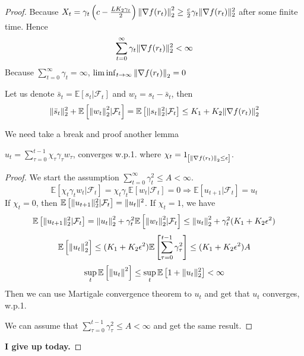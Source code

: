 \begin{theorem}
\begin{proof}
        Because $ X_t = \gamma_t \left( c - \frac{LK_2 \gamma_t}{2}  \right) {\Arrowvert \nabla f(r_t) \Arrowvert}_2^2 \ge \frac{c}{2} \gamma_t \Arrowvert \nabla f(r_t) \Arrowvert^2_2 $ after some finite time. Hence
        \[
            \sum^{\infty}_{t=0} \gamma_t \Arrowvert \nabla f(r_t) \Arrowvert^2_2 < \infty
        \]
        Because $ \sum^{\infty}_{t=0} \gamma_t = \infty $, $ \liminf_{t \rightarrow \infty} {\Arrowvert \nabla f(r_t) \Arrowvert}_2 = 0 $
        
        Let us denote $ \bar s_t = \mathbb{E}\left[ s_t | \mathcal{F}_t \right] $ and $ w_t = s_t - \bar s_t $, then
        \[
            \Arrowvert \bar s_t \Arrowvert^2_2 + \mathbb{E} \left[ {\Arrowvert w_t \Arrowvert}_2^2 | \mathcal{F}_t \right] = \mathbb{E} \left[ \Arrowvert s_t \Arrowvert^2_2 | \mathcal{F}_t \right] \le K_1 + K_2 {\Arrowvert \nabla f(r_t) \Arrowvert}_2^2
        \]
        
        We need take a break and proof another lemma
        \begin{lemma}
            $ u_t = \sum^{t-1}_{\tau = 0} \chi_\tau \gamma_\tau w_{\tau} $, converges w.p.1.
            where $ \chi_t = 1_{\left[ {\Arrowvert \nabla f(r_t) \Arrowvert}_2 \le \epsilon \right]} $.
            \begin{proof}
                We start the assumption $ \sum^{\infty}_{t=0} \gamma^2_t \le A < \infty $.
                \[
                    \mathbb{E}\left[ \chi_t \gamma_t w_t | \mathcal{F}_t \right] = \chi_t \gamma_t \mathbb{E}\left[ w_t | \mathcal{F}_t \right] = 0 \Rightarrow \mathbb{E}\left[ u_{t+1} | \mathcal{F}_t \right] = u_t
                \]
                If $ \chi_t = 0 $, then $ \mathbb{E}\left[ \Arrowvert u_{t+1} \Arrowvert^2_2 | \mathcal{F}_t \right] = \Arrowvert u_t \Arrowvert^2 $. If $ \chi_t = 1 $, we have
                \[
                    \mathbb{E}\left[ \Arrowvert u_{t+1} \Arrowvert^2_2 | \mathcal{F}_t \right]
                    = {\Arrowvert u_t \Arrowvert}_2^2 + \gamma^2_t \mathbb{E}\left[ {\Arrowvert w_t \Arrowvert}_2^2 | \mathcal{F}_t \right] \le {\Arrowvert u_t \Arrowvert}_2^2 + \gamma^2_t (K_1 + K_2 \epsilon^2)
                \]
                \[
                    \mathbb{E}\left[ {\Arrowvert u_t \Arrowvert}_2^2 \right] \le (K_1 + K_2 \epsilon^2) \mathbb{E} \left[ \sum^{t-1}_{\tau = 0} \gamma^2_\tau \right] \le (K_1 + K_2 \epsilon^2)A
                \]
                \[
                    \sup_t \mathbb{E}\left[ {\Arrowvert u_t \Arrowvert}^2 \right] \le \sup_t \mathbb{E} \left[ 1 + \Arrowvert u_t \Arrowvert^2_2 \right] < \infty
                \]
                Then we can use Martigale convergence theorem to $ u_t $ and get that $ u_t $ converges, w.p.1.
                
                We can assume that $ \sum^{t-1}_{\tau = 0} \gamma^2_\tau \le A < \infty $ and get the same result.
            \end{proof}
        \end{lemma}
        \textbf{I give up today.}
    \end{proof}
\end{theorem}


